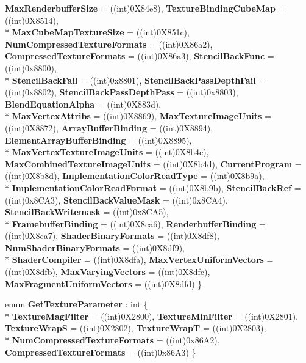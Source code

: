\begin{DoxyCompactItemize}
{\bfseries Max\-Renderbuffer\-Size} = ((int)0\-X84e8), 
{\bfseries Texture\-Binding\-Cube\-Map} = ((int)0\-X8514), 
\\*
{\bfseries Max\-Cube\-Map\-Texture\-Size} = ((int)0\-X851c), 
{\bfseries Num\-Compressed\-Texture\-Formats} = ((int)0\-X86a2), 
{\bfseries Compressed\-Texture\-Formats} = ((int)0\-X86a3), 
{\bfseries Stencil\-Back\-Func} = ((int)0x8800), 
\\*
{\bfseries Stencil\-Back\-Fail} = ((int)0x8801), 
{\bfseries Stencil\-Back\-Pass\-Depth\-Fail} = ((int)0x8802), 
{\bfseries Stencil\-Back\-Pass\-Depth\-Pass} = ((int)0x8803), 
{\bfseries Blend\-Equation\-Alpha} = ((int)0\-X883d), 
\\*
{\bfseries Max\-Vertex\-Attribs} = ((int)0\-X8869), 
{\bfseries Max\-Texture\-Image\-Units} = ((int)0\-X8872), 
{\bfseries Array\-Buffer\-Binding} = ((int)0\-X8894), 
{\bfseries Element\-Array\-Buffer\-Binding} = ((int)0\-X8895), 
\\*
{\bfseries Max\-Vertex\-Texture\-Image\-Units} = ((int)0\-X8b4c), 
{\bfseries Max\-Combined\-Texture\-Image\-Units} = ((int)0\-X8b4d), 
{\bfseries Current\-Program} = ((int)0\-X8b8d), 
{\bfseries Implementation\-Color\-Read\-Type} = ((int)0\-X8b9a), 
\\*
{\bfseries Implementation\-Color\-Read\-Format} = ((int)0\-X8b9b), 
{\bfseries Stencil\-Back\-Ref} = ((int)0x8\-C\-A3), 
{\bfseries Stencil\-Back\-Value\-Mask} = ((int)0x8\-C\-A4), 
{\bfseries Stencil\-Back\-Writemask} = ((int)0x8\-C\-A5), 
\\*
{\bfseries Framebuffer\-Binding} = ((int)0\-X8ca6), 
{\bfseries Renderbuffer\-Binding} = ((int)0\-X8ca7), 
{\bfseries Shader\-Binary\-Formats} = ((int)0\-X8df8), 
{\bfseries Num\-Shader\-Binary\-Formats} = ((int)0\-X8df9), 
\\*
{\bfseries Shader\-Compiler} = ((int)0\-X8dfa), 
{\bfseries Max\-Vertex\-Uniform\-Vectors} = ((int)0\-X8dfb), 
{\bfseries Max\-Varying\-Vectors} = ((int)0\-X8dfc), 
{\bfseries Max\-Fragment\-Uniform\-Vectors} = ((int)0\-X8dfd)
 \}
\item 
enum {\bfseries Get\-Texture\-Parameter} \-: int \{ \\*
{\bfseries Texture\-Mag\-Filter} = ((int)0\-X2800), 
{\bfseries Texture\-Min\-Filter} = ((int)0\-X2801), 
{\bfseries Texture\-Wrap\-S} = ((int)0\-X2802), 
{\bfseries Texture\-Wrap\-T} = ((int)0\-X2803), 
\\*
{\bfseries Num\-Compressed\-Texture\-Formats} = ((int)0x86\-A2), 
{\bfseries Compressed\-Texture\-Formats} = ((int)0x86\-A3)
 \}
\item 

\end{DoxyCompactItemize}
